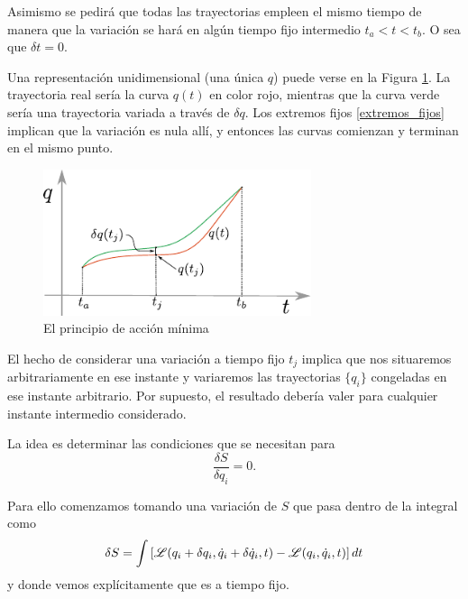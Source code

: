 \documentclass[10pt,oneside]{CBFT_book}
\begin{document}
Asimismo se pedirá que todas las trayectorias empleen el mismo tiempo de manera que la variación se hará en algún
tiempo fijo intermedio $ t_a < t < t_b $. O sea que $\delta t = 0$.


Una representación unidimensional (una única $q$) puede verse en la Figura \ref{principio_accion_minima}.
La trayectoria real sería la curva $ q(t) $ en color rojo, mientras que la curva verde sería una trayectoria variada
a través de $ \delta q $. Los extremos fijos \eqref{extremos_fijos} implican que la variación es nula allí, y entonces
las curvas comienzan y terminan en el mismo punto.

\begin{figure}
	\begin{center}
	\includegraphics[width=0.7\textwidth]{images/fig_accion.pdf}	 
	\end{center}
	\caption{El principio de acción mínima}
	\label{principio_accion_minima}
\end{figure}

El hecho de considerar una variación a tiempo fijo $t_j$ implica que nos situaremos arbitrariamente en ese instante
y variaremos las trayectorias $ \{ q_i \} $ congeladas en ese instante arbitrario. Por supuesto, el resultado debería
valer para cualquier instante intermedio considerado.

La idea es determinar las condiciones que se necesitan para 
\[
	\frac{\delta S}{\delta q_i} = 0.
\]

Para ello comenzamos tomando una variación de $S$ que pasa dentro de la integral como 
\[
	\delta S = \int \left[ \mathscr{L}(q_i + \delta q_i, \dot{q}_i + \delta \dot{q}_i , t )
	- \mathscr{L}(q_i , \dot{q}_i , t ) \right] dt
\]
y donde vemos explícitamente que es a tiempo fijo.
\end{document}

